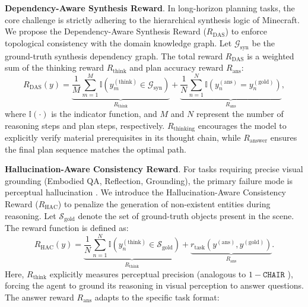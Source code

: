 \noindent\textbf{Dependency-Aware Synthesis Reward}.
In long-horizon planning tasks, the core challenge is strictly adhering to the hierarchical synthesis logic of Minecraft. We propose the Dependency-Aware Synthesis Reward ($R_{\text{DAS}}$) to enforce topological consistency with the domain knowledge graph.
Let $\mathcal{G}_{\text{syn}}$ be the ground-truth synthesis dependency graph. The total reward $R_{\text{DAS}}$ is a weighted sum of the thinking reward $R_\text{think}$ and plan accuracy reward $R_\text{ans}$:
\begin{equation}
R_{\text{DAS}}(y) = \underbrace{\frac{1}{M} \sum_{m=1}^{M} \mathbb{I}(y^{(\text{think})}_m \in \mathcal{G}_{\text{syn}})}_{R_{\text{think}}} + \underbrace{\frac{1}{N} \sum_{n=1}^{N} \mathbb{I}(y^{(\text{ans})}_n = y^{(\text{gold})}_n)}_{R_{\text{ans}}},
\end{equation}
where $\mathbb{I}(\cdot)$ is the indicator function, and $M$ and $N$ represent the number of reasoning steps and plan steps, respectively. $R_{\text{thinking}}$ encourages the model to explicitly verify material prerequisites in its thought chain, while $R_{\text{answer}}$ ensures the final plan sequence matches the optimal path.


\noindent\textbf{Hallucination-Aware Consistency Reward}.
For tasks requiring precise visual grounding (Embodied QA, Reflection, Grounding), the primary failure mode is perceptual hallucination \cite{bai2024hallucination}. We introduce the Hallucination-Aware Consistency Reward ($R_{\text{HAC}}$) to penalize the generation of non-existent entities during reasoning.
Let $\mathcal{S}_{\text{gold}}$ denote the set of ground-truth objects present in the scene. The reward function is defined as:
\begin{equation}
R_{\text{HAC}}(y) = \underbrace{\frac{1}{N} \sum_{n=1}^{N} \mathbb{I}(y^{(\text{think})}_n \in \mathcal{S}_{\text{gold}})}_{R_{\text{think}}} + \underbrace{r_{\text{task}}(y^{(\text{ans})}, y^{(\text{gold})})}_{R_{\text{ans}}}.
\end{equation}
Here, $R_\text{think}$ explicitly measures perceptual precision (analogous to $1 - \texttt{CHAIR}$ \cite{rohrbach2018object}), forcing the agent to ground its reasoning in visual perception to answer questions.
The answer reward $R_\text{ans}$ adapts to the specific task format:

